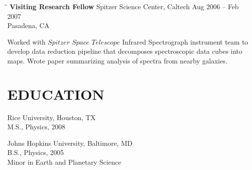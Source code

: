 \documentclass{res}
\begin{document}
\begin{resume}
      \begin{tabbing}
   \hspace{2.3in}\= \hspace{2.6in}\= \kill %
    {\bf Visiting Research Fellow} \>Spitzer Science Center, Caltech \> Aug 2006 -- Feb 2007\\
                          \>Pasadena, CA
   \end{tabbing}\vspace{-20pt}
 Worked with $Spitzer$ $Space$ $Telescope$ Infrared Spectrograph instrument team to develop data reduction pipeline that decomposes spectroscopic data cubes into maps.  Wrote paper summarizing analysis of spectra from nearby galaxies.  
  

\section{EDUCATION}
    Rice University, Houston, TX \\
    M.S., Physics, 2008
    
    Johns Hopkins University, Baltimore, MD  \\        
    B.S., Physics, 2005\\
    Minor in Earth and Planetary Science       
    

\end{resume}
\end{document}
